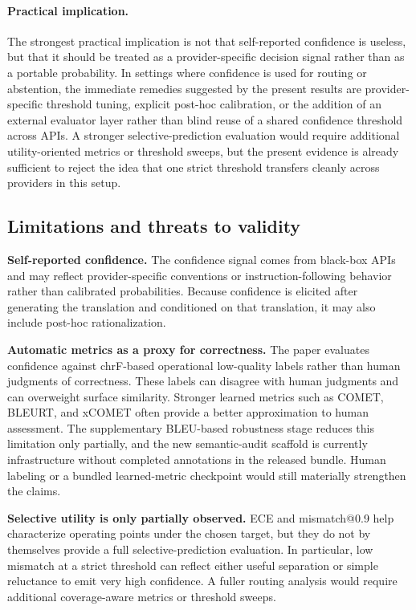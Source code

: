 \documentclass[10pt,conference]{IEEEtran}
\begin{document}
\paragraph{Practical implication.}
The strongest practical implication is not that self-reported confidence is useless, but that it should be treated as a provider-specific decision signal rather than as a portable probability. In settings where confidence is used for routing or abstention, the immediate remedies suggested by the present results are provider-specific threshold tuning, explicit post-hoc calibration, or the addition of an external evaluator layer rather than blind reuse of a shared confidence threshold across APIs. A stronger selective-prediction evaluation would require additional utility-oriented metrics or threshold sweeps, but the present evidence is already sufficient to reject the idea that one strict threshold transfers cleanly across providers in this setup.

\subsection{Limitations and threats to validity}
\textbf{Self-reported confidence.} The confidence signal comes from black-box APIs and may reflect provider-specific conventions or instruction-following behavior rather than calibrated probabilities. Because confidence is elicited after generating the translation and conditioned on that translation, it may also include post-hoc rationalization.

\textbf{Automatic metrics as a proxy for correctness.} The paper evaluates confidence against chrF-based operational low-quality labels rather than human judgments of correctness. These labels can disagree with human judgments and can overweight surface similarity. Stronger learned metrics such as COMET, BLEURT, and xCOMET often provide a better approximation to human assessment. The supplementary BLEU-based robustness stage reduces this limitation only partially, and the new semantic-audit scaffold is currently infrastructure without completed annotations in the released bundle. Human labeling or a bundled learned-metric checkpoint would still materially strengthen the claims.

\textbf{Selective utility is only partially observed.} ECE and mismatch@0.9 help characterize operating points under the chosen target, but they do not by themselves provide a full selective-prediction evaluation. In particular, low mismatch at a strict threshold can reflect either useful separation or simple reluctance to emit very high confidence. A fuller routing analysis would require additional coverage-aware metrics or threshold sweeps.
\end{document}
